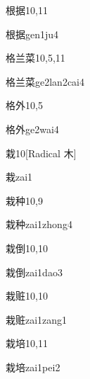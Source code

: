 \begin{entry}{根据}{10,11}
  \begin{phonetics}{根据}{gen1ju4}
  \end{phonetics}
\end{entry}

\begin{entry}{格兰菜}{10,5,11}
  \begin{phonetics}{格兰菜}{ge2lan2cai4}
  \end{phonetics}
\end{entry}

\begin{entry}{格外}{10,5}
  \begin{phonetics}{格外}{ge2wai4}
  \end{phonetics}
\end{entry}

\begin{entry}{栽}{10}[Radical 木]
  \begin{phonetics}{栽}{zai1}
  \end{phonetics}
\end{entry}

\begin{entry}{栽种}{10,9}
  \begin{phonetics}{栽种}{zai1zhong4}
  \end{phonetics}
\end{entry}

\begin{entry}{栽倒}{10,10}
  \begin{phonetics}{栽倒}{zai1dao3}
  \end{phonetics}
\end{entry}

\begin{entry}{栽赃}{10,10}
  \begin{phonetics}{栽赃}{zai1zang1}
  \end{phonetics}
\end{entry}

\begin{entry}{栽培}{10,11}
  \begin{phonetics}{栽培}{zai1pei2}
  \end{phonetics}
\end{entry}

